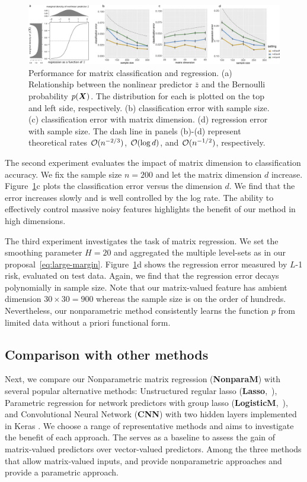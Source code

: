 \documentclass[11pt]{article}
\theoremstyle{definition}
\def\CNN{\text{\bf \small CNN }}
\def\Lasso{\text{\bf \small Lasso }}
\def\NonparaM{\text{\bf \small NonparaM }}
\def\LogisticM{\text{\bf \small LogisticM }}
\begin{document}
\begin{figure}[ht]
    \centering
    \includegraphics[width=\textwidth]{combined.pdf}
    \caption{Performance for matrix classification and regression. (a) Relationship between the nonlinear predictor $\bar z$ and the Bernoulli probability $p(\bm X)$. The distribution for each is plotted on the top and left side, respectively. (b) classification error with sample size. (c) classification error with matrix dimension. (d) regression error with sample size. The dash line in panels (b)-(d) represent theoretical rates $\mathcal{O}(n^{-2/3})$, $\mathcal{O}(\log d)$, and $\mathcal{O}(n^{-1/2})$, respectively.}\label{fig:logistic}
\end{figure}

The second experiment evaluates the impact of matrix dimension to classification accuracy. We fix the sample size $n=200$ and let the matrix dimension $d$ increase. Figure~\ref{fig:logistic}c plots the classification error versus the dimension $d$. We find that the error increases slowly and is well controlled by the log rate.  The ability to effectively control massive noisy features highlights the benefit of our method in high dimensions. 

The third experiment investigates the task of matrix regression. We set the smoothing parameter $H=20$ and aggregated the multiple level-sets as in our proposal~\eqref{eq:large-margin}. Figure~\ref{fig:logistic}d shows the regression error measured by $L$-1 risk, evaluated on test data. Again, we find that the regression error decays polynomially in sample size. Note that our matrix-valued feature has ambient dimension $30\times 30=900$ whereas the sample size is on the order of hundreds. Nevertheless, our nonparametric method consistently learns the function $p$ from limited data without a priori functional form.


 


\subsection{Comparison with other methods}\label{sec:comparison}
Next, we compare our Nonparametric matrix regression ({\bf \small NonparaM}) with several popular alternative methods: Unstructured regular lasso ({\bf \small Lasso},~\cite{friedman2010regularization}), Parametric regression for network predictors with group lasso ({\bf \small LogisticM},~\cite{relion2019network}), and Convolutional Neural Network ({\bf \small CNN}) with two hidden layers implemented in Keras \citep{chollet2015keras}. We choose a range of representative methods and aims to investigate the benefit of each approach. The \Lasso serves as a baseline to assess the gain of matrix-valued predictors over vector-valued predictors. 
Among the three methods that allow matrix-valued inputs, \CNN and \NonparaM provide nonparametric approaches and \LogisticM provide a parametric approach. 
\end{document}
